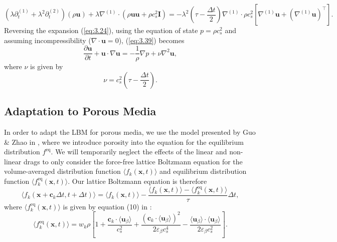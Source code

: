 \documentclass[a4paper, 11pt]{report}
\begin{document}
\begin{equation}
    \left(\lambda \partial_t^{(1)} + \lambda^2 \partial_t^{(2)}\right)(\rho\mathbf{u}) + \lambda\nabla^{(1)}\cdot\left( \rho\mathbf{u}\mathbf{u} + \rho c_s^2 \mathbf{I}\right) = -\lambda^2\left(\tau-\frac{\Delta t}{2}\right)\nabla^{(1)}\cdot\rho c_s^2\left[\nabla^{(1)}\mathbf{u} + (\nabla^{(1)}\mathbf{u})^\intercal\right]. \label{eq:3.39}
\end{equation}
Reversing the expansion (\ref{eq:3.24}), using the equation of state $p=\rho c_s^2$ and assuming incompressibility ($\nabla\cdot\mathbf{u}=0$), (\ref{eq:3.39}) becomes
\begin{equation}
    \frac{\partial\mathbf{u}}{\partial t} + \mathbf{u}\cdot\nabla\mathbf{u} = -\frac{1}{\rho}\nabla p + \nu\nabla^2\mathbf{u}, \label{eq:3.40}
\end{equation}
where $\nu$ is given by
\begin{equation}
    \nu = c_s^2\left(\tau-\frac{\Delta t}{2}\right). \label{eq:3.41}
\end{equation}

\subsection{Adaptation to Porous Media}
In order to adapt the LBM for porous media, we use the model presented by Guo \& Zhao in \cite{guo+zhao}, where we introduce porosity into the equation for the equilibrium distribution $f^{\mathrm{eq}}$. We will temporarily neglect the effects of the linear and non-linear drags to only consider the force-free lattice Boltzmann equation for the volume-averaged distribution function $\langle f_k(\mathbf{x},t) \rangle$ and equilibrium distribution function $\langle f_k^{\mathrm{eq}}(\mathbf{x},t) \rangle$. Our lattice Boltzmann equation is therefore
\begin{equation}
    \langle f_k(\mathbf{x} + \mathbf{c}_k\Delta t,t + \Delta t) \rangle = \langle f_k(\mathbf{x},t) \rangle - \frac{\langle f_k(\mathbf{x},t) \rangle - \langle f_k^{\mathrm{eq}}(\mathbf{x},t) \rangle}{\tau}\Delta t, \label{eq:3.42}
\end{equation}
where $\langle f_k^{\mathrm{eq}}(\mathbf{x},t) \rangle$ is given by equation (10) in \cite{guo+zhao}:
\begin{equation}
    \langle f_k^{\mathrm{eq}}(\mathbf{x},t) \rangle = w_k\rho\left[1 + \frac{\mathbf{c}_k\cdot\langle\mathbf{u}_\beta\rangle}{c_s^2} + \frac{\left(\mathbf{c}_k\cdot\langle\mathbf{u}_\beta\rangle\right)^2}{2\varepsilon_\beta c_s^4} - \frac{\langle\mathbf{u}_\beta\rangle\cdot\langle\mathbf{u}_\beta\rangle}{2\varepsilon_\beta c_s^2}\right]. \label{eq:3.43}
\end{equation}
\end{document}
